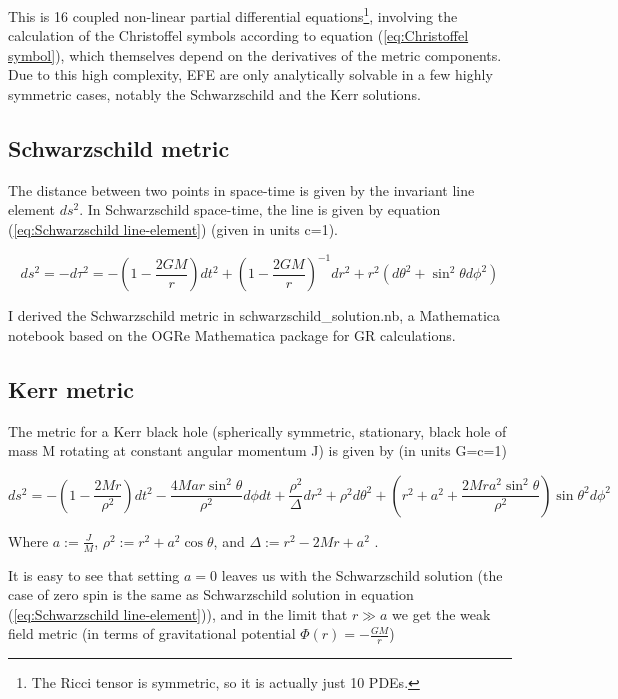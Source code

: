 This is 16 coupled non-linear partial differential equations\footnote{The Ricci tensor is symmetric, so it is actually just 10 PDEs.}, involving the calculation of the Christoffel symbols according to equation (\ref{eq:Christoffel symbol}), which themselves depend on the derivatives of the metric components. Due to this high complexity, EFE are only analytically solvable in a few highly symmetric cases, notably the Schwarzschild and the Kerr solutions.

\subsection{Schwarzschild metric}

The distance between two points in space-time is given by the invariant line element $ds^2$. In Schwarzschild space-time, the line is given by equation (\ref{eq:Schwarzschild line-element}) (given in units c=1).

\begin{equation}
    ds^2 = - d\tau^2 = - (1-\frac{2 G M}{r}) dt^2 +  (1-\frac{2 G M}{r})^{-1} dr^2
            + r^2 (d\theta^2+\sin^2\theta d\phi^2)
\label{eq:Schwarzschild line-element}
\end{equation}

I derived the Schwarzschild metric in schwarzschild\_solution.nb, a Mathematica notebook based on the OGRe Mathematica package \cite{Shoshany2021_OGRe} for GR calculations.

\subsection{Kerr metric}

The metric for a Kerr black hole (spherically symmetric, stationary, black hole of mass M rotating at constant angular momentum J) is given by (in units G=c=1)

\begin{equation}\label{eq:Kerr metric}
    ds^2 = -\left(1-\frac{2Mr}{\rho^2}\right) dt^2-\frac{4Mar \sin^2{\theta}}{\rho^2} d\phi dt+ \frac{\rho^2}{\Delta} dr^2 + \rho^2 d\theta^2 +\left(r^2+a^2+
    \frac{2Mra^2\sin^2{\theta}}{\rho^2}
    \right)\sin{\theta}^2 d\phi^2
\end{equation}

Where $a:=\frac{J}{M}$, $\rho^2:=r^2+a^2 \cos{\theta}$, and $\Delta:=r^2-2Mr+a^2$ \cite{carroll2019spacetime}.

It is easy to see that setting $a=0$ leaves us with the Schwarzschild solution (the case of zero spin is the same as Schwarzschild solution in equation (\ref{eq:Schwarzschild line-element})), and in the limit that $r \gg a$ we get the weak field metric (in terms of gravitational potential $\Phi(r)=-\frac{G M}{r}$)

